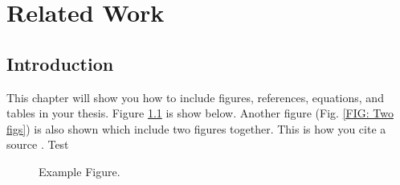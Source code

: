 \chapter{\leavevmode\newline Related Work}
\label{chap:chapter_2}



\section{Introduction}
This chapter will show you how to include figures, references, equations, and tables in your thesis. Figure \ref{FIG: engine and num model diagram} is show below. Another figure (Fig. \ref{FIG: Two figs}) is also shown which include two figures together. This is how you cite a source \cite{yang2019bee+} \cite{nellis_klein_2012}. Test


\begin{figure}
\centering
        \caption{Example Figure.}
        \label{FIG: engine and num model diagram}
\end{figure}


